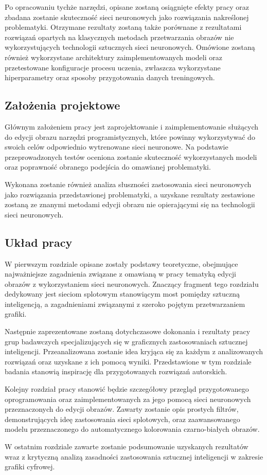     Po opracowaniu tychże narzędzi, opisane zostaną osiągnięte efekty pracy oraz
    zbadana zostanie skuteczność sieci neuronowych jako rozwiązania nakreślonej
    problematyki. Otrzymane rezultaty zostaną także porównane z rezultatami
    rozwiązań opartych na klasycznych metodach przetwarzania obrazów nie
    wykorzystujących technologii sztucznych sieci neuronowych.
    Omówione zostaną również wykorzystane architektury zaimplementowanych
    modeli oraz przetestowane konfiguracje procesu uczenia, zwłaszcza wykorzystane
    hiperparametry oraz sposoby przygotowania danych treningowych.

  \subsection{Założenia projektowe}

    Głównym założeniem pracy jest zaprojektowanie i zaimplementowanie
    służących do edycji obrazu narzędzi programistycznych, które powinny
    wykorzystywać do swoich celów odpowiednio wytrenowane sieci neuronowe.
    Na podstawie przeprowadzonych testów oceniona zostanie skuteczność
    wykorzystanych modeli oraz poprawność obranego podejścia do
    omawianej problematyki.

    Wykonana zostanie również analiza słuszności zastosowania sieci
    neuronowych jako rozwiązania przedstawionej problematyki, a uzyskane
    rezultaty zestawione zostaną ze znanymi metodami edycji
    obrazu nie opierającymi się na technologii sieci neuronowych.

  \subsection{Układ pracy}

    W pierwszym rozdziale opisane zostały podstawy teoretyczne, obejmujące najważniejsze
    zagadnienia związane z omawianą w pracy tematyką edycji obrazów z
    wykorzystaniem sieci neuronowych. Znaczący fragment tego rozdziału dedykowany
    jest sieciom splotowym stanowiącym most pomiędzy sztuczną
    inteligencją, a zagadnieniami związanymi z szeroko pojętym przetwarzaniem
    grafiki.

    Następnie zaprezentowane zostaną dotychczasowe dokonania i rezultaty pracy
    grup badawczych specjalizujących się w graficznych zastosowaniach sztucznej
    inteligencji.
    Przeanalizowana zostanie idea kryjąca się za każdym z analizowanych
    rozwiązań oraz uzyskane z ich pomocą wyniki.
    Przedstawione w tym rozdziale badania stanowią inspirację dla przygotowanych
    rozwiązań autorskich.

    Kolejny rozdział pracy stanowić będzie szczegółowy przegląd przygotowanego
    oprogramowania oraz zaimplementowanych za jego pomocą sieci neuronowych
    przeznaczonych do edycji obrazów. Zawarty zostanie opis prostych filtrów,
    demonstrujących ideę zastosowania sieci splotowych, oraz zaawansowanego
    modelu przeznaczonego do automatycznego kolorowania czarno-białych obrazów.

    W ostatnim rozdziale zawarte zostanie podsumowanie uzyskanych rezultatów wraz
    z krytyczną analizą zasadności zastosowania sztucznej inteligencji w
    zakresie grafiki cyfrowej.

